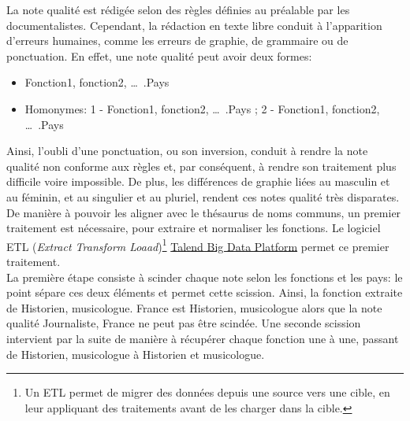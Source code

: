 La note qualité est rédigée selon des règles définies au préalable par les documentalistes. Cependant, la rédaction en texte libre conduit à l'apparition d'erreurs humaines, comme les erreurs de graphie, de grammaire ou de ponctuation. En effet, une note qualité peut avoir deux formes:
\begin{itemize}
	\item Fonction1, fonction2, \dots~.Pays
	\item Homonymes: 1 - Fonction1, fonction2, \dots~.Pays ; 2 - Fonction1, fonction2, \dots~.Pays 
\end{itemize}
Ainsi, l'oubli d'une ponctuation, ou son inversion, conduit à rendre la note qualité non conforme aux règles et, par conséquent, à rendre son traitement plus difficile voire impossible. De plus, les différences de graphie liées au masculin et au féminin, et au singulier et au pluriel, rendent ces notes qualité très disparates.\\

De manière à pouvoir les aligner avec le thésaurus de noms communs, un premier traitement est nécessaire, pour extraire et normaliser les fonctions. Le logiciel ETL (\textit{Extract Transform Loaad})\footnote{Un ETL permet de migrer des données depuis une source vers une cible, en leur appliquant des traitements avant de les charger dans la cible.} \href{https://www.talend.com/fr/products/big-data/}{Talend Big Data Platform} permet ce premier traitement.\\

La première étape consiste à scinder chaque note selon les fonctions et les pays: le point sépare ces deux éléments et permet cette scission. Ainsi, la fonction extraite de \og Historien, musicologue. France\fg{} est \og Historien, musicologue\fg{} alors que la note qualité \og Journaliste, France\fg{} ne peut pas être scindée. Une seconde scission intervient par la suite de manière à récupérer chaque fonction une à une, passant de \og Historien, musicologue\fg{} à \og Historien\fg{} et \og musicologue\fg{}.\\

